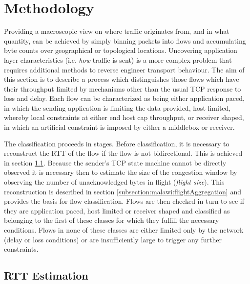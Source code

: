 \section{Methodology}

Providing a macroscopic view on where traffic originates from, and in what quantity, can be achieved by simply binning packets into flows and accumulating byte counts over geographical or topological locations. 
Uncovering application layer characteristics (i.e. \textit{how} traffic is sent) is a more complex problem that requires additional methods to reverse engineer transport behaviour.
The aim of this section is to describe a process which distinguishes those flows which have their throughput limited by mechanisms other than the usual \ac{TCP} response to loss and delay.
Each flow can be characterized as being either application paced, in which the sending application is limiting the data provided, host limited, whereby local constraints at either end host cap throughput, or receiver shaped, in which an artificial constraint is imposed by either a middlebox or receiver.

The classification proceeds in stages. 
Before classification, it is necessary to reconstruct the RTT of the flow if the flow is not bidirectional.  
This is achieved in section \ref{subsection:malawi:PeriodicEnhancement}. 
Because the sender's TCP state machine cannot be directly observed it is necessary then to estimate the size of the congestion window by observing the number of unacknowledged bytes in flight (\textit{flight size}).
This reconstruction is described in section \ref{subsection:malawi:flightAggregation} and provides the basis for flow classification. 
Flows are then checked in turn to see if they are application paced, host limited or receiver shaped and classified as belonging to the first of these classes for which they fulfill the necessary conditions.
Flows in none of these classes are either limited only by the network (delay or loss conditions) or are insufficiently large to trigger any further constraints.

\subsection{\acs{RTT} Estimation}
\label{subsection:malawi:PeriodicEnhancement}

